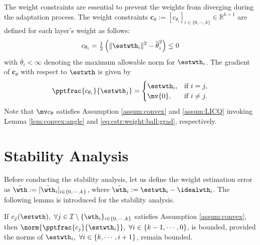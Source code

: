 \documentclass[lettersize,journal]{IEEEtran}
\begin{document}
The weight constraints are essential to prevent the weights from diverging during the adaptation process.
The weight constraints $\boldsymbol{c}_{\theta}:= [c_{\theta_i}]_{i\in\{0,\cdots ,k\}}\in\mathbb R^{k+1}$ are defined for each layer's weight as follows:
\begin{equation}
    c_{\theta_i}
    =
    \tfrac{1}{2}
    \left(
        \Vert \estwth_i\Vert^2 
        -
        \overline\theta_i^2 
    \right)    
    \le 0
    \label{eq:cstr:weight:ball}
\end{equation}
with $\overline\theta_i<\infty$ denoting the maximum allowable norm for $\estwth_i$. 
The gradient of $\boldsymbol{c}_\theta$ with respect to $\estwth$ is given by
\begin{equation}
    \pptfrac{c_{\theta_i}}{\estwth_j} 
    =
    \begin{cases}
        \estwth_i,
        &
        \text{if } i=j,
        \\
        \mv{0},
        &
        \text{if } i\ne j
        .
    \end{cases} 
    \label{eq:cstr:weight:ball:grad}
\end{equation}
Note that $\mv c_{\theta}$ satisfies Assumption \ref{assum:convex} and \ref{assum:LICQ} invoking Lemma \ref{lem:convex:angle} and \eqref{eq:cstr:weight:ball:grad}, respectively.

\section{Stability Analysis}\label{sec:stability}

Before conducting the stability analysis, let us define the weight estimation error as $\tilde\wth:= [\tilde\wth_i]_{i\in\{0,\cdots,k\}}$, where $\tilde\wth_i:=\estwth_i-\idealwth_i$.
The following lemma is introduced for the stability analysis.

\begin{lem} 
    If $c_j(\estwth),\ \forall j\in\mathcal I \setminus \{\wth_i\}_{i\in\{0,\cdots,k\}}$ satisfies Assumption \ref{assum:convex}, then $\norm{\pptfrac{c_j}{\estwth_i}},\ \forall i\in\{k-1,\cdots, 0\}$, is bounded, provided the norms of $\estwth_i,\ \forall i\in\{k,\cdots, i+1\}$, remain bounded.
    \label{lem:cstr:grad:bound}
\end{lem}
\end{document}
